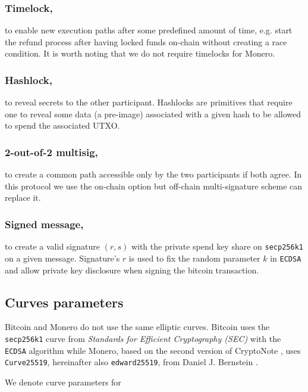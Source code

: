 \documentclass{llncs}
\begin{document}
\subsubsection{Timelock,}
to enable new execution paths after some predefined amount of time, e.g. start the refund process after having locked funds on-chain without creating a race condition. It is worth noting that we do not require timelocks for Monero.

\subsubsection{Hashlock,}
to reveal secrets to the other participant. Hashlocks are primitives that require one to reveal some data (a pre-image) associated with a given hash to be allowed to spend the associated UTXO.

\subsubsection{2-out-of-2 multisig,}
to create a common path accessible only by the two participants if both agree. In this protocol we use the on-chain option but off-chain multi-signature scheme can replace it.

\subsubsection{Signed message,}
to create a valid signature $(r, s)$ with the private spend key share on \texttt{secp256k1} on a given message. Signature's $r$ is used to fix the random parameter $k$ in \texttt{ECDSA} and allow private key disclosure when signing the bitcoin transaction.

\subsection{Curves parameters}
\label{curveParams}
Bitcoin and Monero do not use the same elliptic curves. Bitcoin uses the \texttt{secp256k1} curve from \textit{Standards for Efficient Cryptography (SEC)} with the \texttt{ECDSA} algorithm while Monero, based on the second version of CryptoNote \cite{van2013cryptonote}, uses \texttt{Curve25519}, hereinafter also \texttt{edward25519}, from Daniel J. Bernstein \cite{CerRes10}.

We denote curve parameters for
\end{document}
